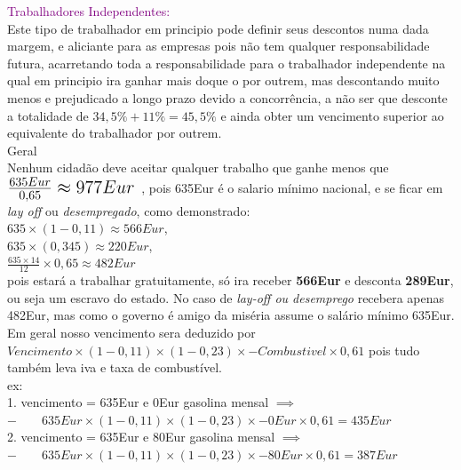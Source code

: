 \textup{\large \textcolor{purple}{Trabalhadores Independentes:}}\\

Este tipo de trabalhador em principio pode definir seus descontos numa dada margem, e aliciante para as empresas pois não tem qualquer responsabilidade futura, acarretando toda a responsabilidade para o trabalhador independente na qual em principio ira ganhar mais doque o por outrem, mas descontando muito menos e prejudicado a longo prazo devido a concorrência, a não ser que desconte a totalidade de $34,5\%+11\%=45,5\%$ e ainda obter um vencimento superior ao equivalente do trabalhador por outrem.\\

Geral\\
Nenhum cidadão deve aceitar qualquer trabalho que ganhe menos que \; $ \mbox{\Large $ \frac{635Eur}{0,65}\approx 977Eur $ } $, pois 635Eur é o salario mínimo nacional, e se ficar em \textit{lay off} ou \textit{desempregado}, como demonstrado:\\
$635\times(1-0,11)\approx566Eur$,\\
$635\times(0,345)\approx220Eur$,\\
$\frac{635\times14}{12}\times0,65 \approx 482Eur$\\
pois estará a trabalhar gratuitamente, só ira receber \textbf{566Eur} e desconta \textbf{289Eur}, ou seja um escravo do estado. No caso de \textit{lay-off ou desemprego} recebera apenas 482Eur, mas como o governo é amigo da miséria assume o salário mínimo 635Eur.\\

Em geral nosso vencimento sera deduzido por $Vencimento \times (1-0,11) \times (1-0,23) \times - Combustivel\times 0,61$ pois tudo também leva iva e taxa de combustível.\\
ex:\\
1. vencimento = 635Eur e 0Eur gasolina mensal $\implies$ \\
$- \qquad 635Eur \times (1-0,11) \times (1-0,23) \times - 0Eur \times 0,61 = 435Eur$ \\
2. vencimento = 635Eur e 80Eur gasolina mensal $\implies$ \\
$- \qquad 635Eur \times (1-0,11) \times (1-0,23) \times - 80Eur \times 0,61 = 387Eur$ \\


















